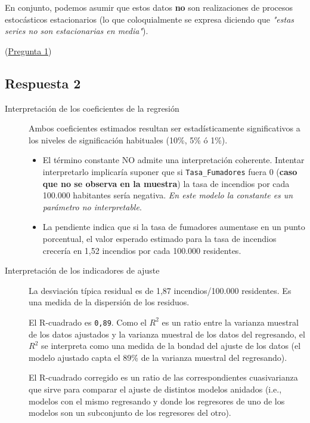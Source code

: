 \documentclass[10pt]{article}
\begin{document}
En conjunto, podemos asumir que estos datos \textbf{no} son realizaciones de procesos estocásticos estacionarios (lo que coloquialmente se expresa diciendo que \emph{"estas series no son estacionarias en media"}).

(\hyperref[sec:org1044afe]{Pregunta 1})
\subsection*{Respuesta 2}
\label{sec:org1a04b04}

\begin{description}
\item[{Interpretación de los coeficientes de la regresión}] Ambos coeficientes estimados resultan ser estadísticamente significativos a los niveles de significación habituales (10\%, 5\% ó 1\%).

\begin{itemize}
\item El término constante NO admite una interpretación coherente. Intentar interpretarlo implicaría suponer que si \texttt{Tasa\_Fumadores} fuera 0 (\textbf{caso que no se observa en la muestra}) la tasa de incendios por cada 100.000 habitantes sería negativa. \emph{En este modelo la constante es un parámetro no interpretable}.

\item La pendiente indica que si la tasa de fumadores aumentase en un punto porcentual, el valor esperado estimado para la tasa de incendios crecería en 1,52 incendios por cada 100.000 residentes.
\end{itemize}

\item[{Interpretación de los indicadores de ajuste}] La desviación típica residual es de 1,87 incendios/100.000 residentes. Es una medida de la dispersión de los residuos.

El R-cuadrado es \texttt{0,89}. Como el \(R^2\) es un ratio entre la varianza muestral de los datos ajustados y la varianza muestral de los datos del regresando, el \(R^2\) se interpreta como una medida de la bondad del ajuste de los datos (el modelo ajustado capta el 89\% de la varianza muestral del regresando). 

El R-cuadrado corregido es un ratio de las correspondientes cuasivarianza que sirve para comparar el ajuste de distintos modelos anidados (i.e., modelos con el mismo regresando y donde los regresores de uno de los modelos son un subconjunto de los regresores del otro).


\end{description}
\end{document}
